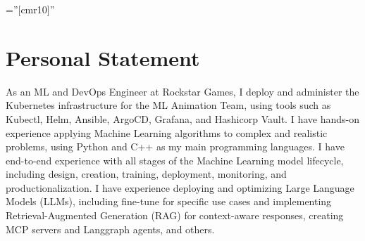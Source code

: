 \documentclass[a4paper,10pt]{article} %
\begin{document}
\pagestyle{empty} %
\BgThispage
\font\fb=''[cmr10]'' %

\small





\par{\bigskip\par} %
\par{\bigskip\par}
\par{\bigskip\par}


\bigskip
\section{Personal Statement}
\bigskip
As an ML and DevOps Engineer at Rockstar Games, I deploy and administer the Kubernetes infrastructure for the ML Animation Team, using tools such as Kubectl, Helm, Ansible, ArgoCD, Grafana, and Hashicorp Vault. I have hands-on experience applying Machine Learning algorithms to complex and realistic problems, using Python and C++ as my main programming languages. I have end-to-end experience with all stages of the Machine Learning model lifecycle, including design, creation, training, deployment, monitoring, and productionalization. I have experience deploying and optimizing Large Language Models (LLMs), including fine-tune for specific use cases and implementing Retrieval-Augmented Generation (RAG) for context-aware responses, creating MCP servers and Langgraph agents, and others.
\end{document}
